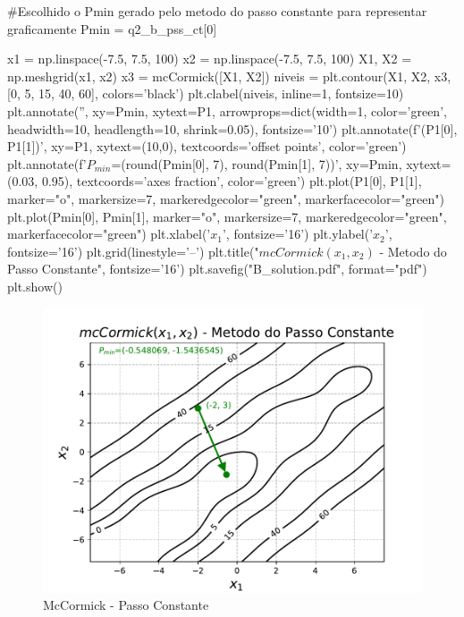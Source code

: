 \documentclass[10pt, a4paper]{article}
\begin{document}
\begin{python}
  #Escolhido o Pmin gerado pelo metodo do passo constante para representar graficamente
  Pmin = q2_b_pss_ct[0]

  x1 = np.linspace(-7.5, 7.5, 100)
  x2 = np.linspace(-7.5, 7.5, 100)
  X1, X2 = np.meshgrid(x1, x2)
  x3 = mcCormick([X1, X2])
  niveis = plt.contour(X1, X2, x3, [0, 5, 15, 40, 60], colors='black')
  plt.clabel(niveis, inline=1, fontsize=10)
  plt.annotate('', xy=Pmin, xytext=P1,
                  arrowprops=dict(width=1, color='green', headwidth=10, headlength=10, shrink=0.05), fontsize='10')
  plt.annotate(f'({P1[0]}, {P1[1]})', xy=P1, xytext=(10,0), textcoords='offset points', color='green')
  plt.annotate(f'$P_{{min}}$=({round(Pmin[0], 7)}, {round(Pmin[1], 7)})', xy=Pmin, xytext=(0.03, 0.95), textcoords='axes fraction', color='green')
  plt.plot(P1[0], P1[1], marker="o", markersize=7, markeredgecolor="green", markerfacecolor="green")
  plt.plot(Pmin[0], Pmin[1], marker="o", markersize=7, markeredgecolor="green", markerfacecolor="green")
  plt.xlabel('$x_1$', fontsize='16')
  plt.ylabel('$x_2$', fontsize='16')
  plt.grid(linestyle='--')
  plt.title("$mcCormick(x_1, x_2)$ - Metodo do Passo Constante", fontsize='16')
  plt.savefig("B_solution.pdf", format="pdf")
  plt.show()
\end{python}

\begin{figure}[htpb]
  \centering
  \includegraphics[width=1\textwidth]{B_solution.pdf}
  \caption{McCormick - Passo Constante}
  \label{fig:q2b}
\end{figure}
\end{document}

